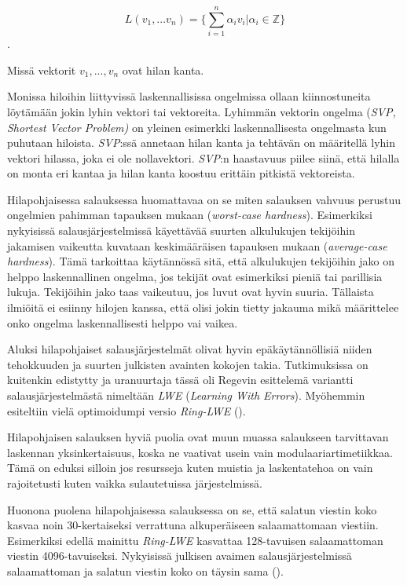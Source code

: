 \[L(v_1,...v_n) =\Bigg\{ {\sum_{i=1}^{n}\alpha_i 
v_i|\alpha_i \in \mathbb{Z}} \Bigg\}\]. 

Missä vektorit $v_1,...,v_n$ ovat hilan kanta.

Monissa hiloihin liittyvissä 
laskennallisissa ongelmissa ollaan kiinnostuneita löytämään jokin lyhin vektori tai vektoreita. Lyhimmän vektorin ongelma (\emph{SVP, Shortest Vector Problem)} on yleinen esimerkki laskennallisesta ongelmasta kun puhutaan hiloista. \emph{SVP}:ssä annetaan hilan kanta ja tehtävän on määritellä lyhin vektori hilassa, joka ei ole nollavektori. \emph{SVP}:n haastavuus piilee siinä, että hilalla on monta eri kantaa ja hilan kanta koostuu erittäin pitkistä vektoreista.

Hilapohjaisessa salauksessa huomattavaa on se miten salauksen vahvuus perustuu ongelmien pahimman tapauksen mukaan (\emph{worst-case hardness}). Esimerkiksi nykyisissä salausjärjestelmissä käyettävää suurten alkulukujen tekijöihin jakamisen vaikeutta kuvataan keskimääräisen tapauksen mukaan (\emph{average-case hardness}). Tämä tarkoittaa käytännössä sitä, että alkulukujen tekijöihin jako on helppo laskennallinen ongelma, jos tekijät ovat esimerkiksi pieniä tai parillisia lukuja. Tekijöihin jako taas vaikeutuu, jos luvut ovat hyvin suuria. Tällaista ilmiöitä ei esiinny hilojen kanssa, että olisi jokin tietty jakauma mikä määrittelee onko ongelma laskennallisesti helppo vai vaikea.

Aluksi hilapohjaiset salausjärjestelmät olivat hyvin epäkäytännöllisiä niiden tehokkuuden ja suurten julkisten avainten kokojen takia. Tutkimuksissa on kuitenkin edistytty ja uranuurtaja tässä oli Regevin esittelemä variantti salausjärjestelmästä nimeltään \emph{LWE} (\emph{Learning With Errors}). Myöhemmin esiteltiin vielä optimoidumpi versio \emph{Ring-LWE} (\cite{8275352}).

Hilapohjaisen salauksen hyviä puolia ovat muun muassa salaukseen tarvittavan laskennan yksinkertaisuus, koska ne vaativat usein vain modulaariartimetiikkaa. Tämä on eduksi silloin jos resursseja kuten muistia ja laskentatehoa on vain rajoitetusti kuten vaikka sulautetuissa järjestelmissä.

Huonona puolena hilapohjaisessa salauksessa on se, että salatun viestin koko kasvaa noin 30-kertaiseksi verrattuna alkuperäiseen salaamattomaan viestiin. Esimerkiksi edellä mainittu \emph{Ring-LWE} kasvattaa 128-tavuisen salaamattoman viestin 4096-tavuiseksi. Nykyisissä julkisen avaimen salausjärjestelmissä salaamattoman ja salatun viestin koko on täysin sama (\cite{8275352}).

